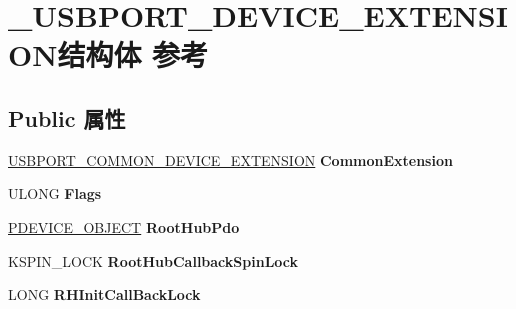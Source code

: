 \hypertarget{struct___u_s_b_p_o_r_t___d_e_v_i_c_e___e_x_t_e_n_s_i_o_n}{}\section{\+\_\+\+U\+S\+B\+P\+O\+R\+T\+\_\+\+D\+E\+V\+I\+C\+E\+\_\+\+E\+X\+T\+E\+N\+S\+I\+O\+N结构体 参考}
\label{struct___u_s_b_p_o_r_t___d_e_v_i_c_e___e_x_t_e_n_s_i_o_n}
\subsection*{Public 属性}
\begin{DoxyCompactItemize}
\item 
\mbox{\label{struct___u_s_b_p_o_r_t___d_e_v_i_c_e___e_x_t_e_n_s_i_o_n_a0cacf5b3c5a0a3c5118024d6f8b8e0fe}} 
\hyperlink{struct___u_s_b_p_o_r_t___c_o_m_m_o_n___d_e_v_i_c_e___e_x_t_e_n_s_i_o_n}{U\+S\+B\+P\+O\+R\+T\+\_\+\+C\+O\+M\+M\+O\+N\+\_\+\+D\+E\+V\+I\+C\+E\+\_\+\+E\+X\+T\+E\+N\+S\+I\+ON} {\bfseries Common\+Extension}
\item 
\mbox{\label{struct___u_s_b_p_o_r_t___d_e_v_i_c_e___e_x_t_e_n_s_i_o_n_ade9dbce38ab5b8729e041c5dc14db943}} 
U\+L\+O\+NG {\bfseries Flags}
\item 
\mbox{\label{struct___u_s_b_p_o_r_t___d_e_v_i_c_e___e_x_t_e_n_s_i_o_n_ae02398f66ff01ed4066400ea3f8e7684}} 
\hyperlink{struct___d_e_v_i_c_e___o_b_j_e_c_t}{P\+D\+E\+V\+I\+C\+E\+\_\+\+O\+B\+J\+E\+CT} {\bfseries Root\+Hub\+Pdo}
\item 
\mbox{\label{struct___u_s_b_p_o_r_t___d_e_v_i_c_e___e_x_t_e_n_s_i_o_n_a5aa4baf7e58fbccba88546ecb428c189}} 
K\+S\+P\+I\+N\+\_\+\+L\+O\+CK {\bfseries Root\+Hub\+Callback\+Spin\+Lock}
\item 
\mbox{\label{struct___u_s_b_p_o_r_t___d_e_v_i_c_e___e_x_t_e_n_s_i_o_n_a3b1d723bd3c09b8081a8d8b2974b5a5b}} 
L\+O\+NG {\bfseries R\+H\+Init\+Call\+Back\+Lock}

\end{DoxyCompactItemize}
